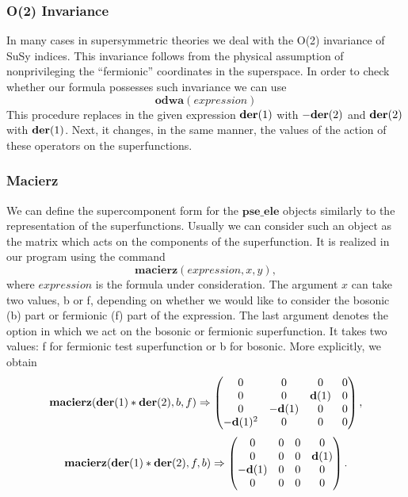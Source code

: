 {\subsubsection*{O(2) Invariance}

In many cases in supersymmetric theories we deal with the O(2)
invariance of SuSy indices.  This invariance follows from the physical
assumption of nonprivileging the ``fermionic'' coordinates in the
superspace.  In order to check whether our formula possesses such
invariance we can use
\begin{equation*}
  \mathbf{odwa}(\mathit{expression})
\end{equation*}
This procedure replaces in the given expression $\mathbf{der}(1)$ with
$-\mathbf{der}(2)$ and $\mathbf{der}(2)$ with $\mathbf{der}(1)$.  Next, it changes, in the
same manner, the values of the action of these operators on the
superfunctions.

\subsubsection*{Macierz}

We can define the supercomponent form for the $\mathbf{pse\_ele}$
objects similarly to the representation of the superfunctions.
Usually we can consider such an object as the matrix which acts on the
components of the superfunction.  It is realized in our program using
the command
\begin{equation*}
  \mathbf{macierz}(\mathit{expression},x,y),
\end{equation*}
where $\mathit{expression}$ is the formula under consideration.  The
argument $x$ can take two values, b or f, depending on whether we
would like to consider the bosonic (b) part or fermionic (f) part of
the expression.  The last argument denotes the option in which we act
on the bosonic or fermionic superfunction.  It takes two values: f for
fermionic test superfunction or b for bosonic.  More explicitly, we
obtain
\begin{equation*}
  \mathbf{macierz}(\mathbf{der}(1)*\mathbf{der}(2),b,f) \Rightarrow
  \begin{pmatrix}
    0 & 0 & 0 & 0 \\
    0 & 0 & \mathbf{d}(1) & 0 \\
    0 & -\mathbf{d}(1) & 0 & 0 \\
    -\mathbf{d}(1)^2 & 0 & 0 & 0
  \end{pmatrix},
\end{equation*}
\begin{equation*}
  \mathbf{macierz}(\mathbf{der}(1)*\mathbf{der}(2),f,b) \Rightarrow
  \begin{pmatrix}
    0 & 0 & 0 & 0 \\
    0 & 0 & 0 & \mathbf{d}(1) \\
    -\mathbf{d}(1) & 0 & 0 & 0 \\
    0 & 0 & 0 & 0
  \end{pmatrix}.
\end{equation*}

}
